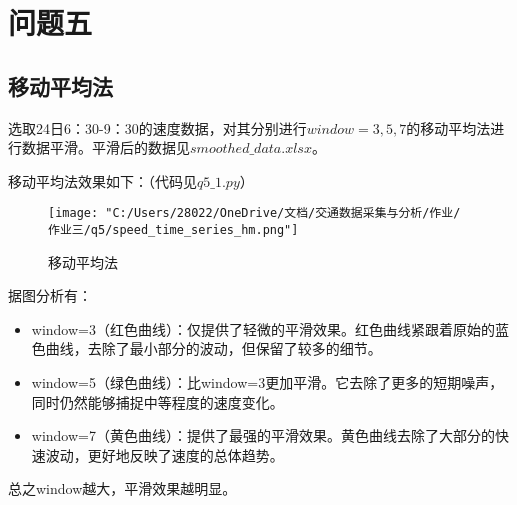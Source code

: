 \documentclass[withoutpreface,bwprint]{cumcmthesis} %
\begin{document}
\section{问题五}
    \subsection{移动平均法}
    选取24日6：30-9：30的速度数据，对其分别进行$window=3,5,7$的移动平均法进行数据平滑。平滑后的数据见$smoothed\_data.xlsx$。\par
    移动平均法效果如下：（代码见$q5\_1.py$）\par
    \begin{figure}[!htbp] 
        \centering
        \texttt{[image: "C:/Users/28022/OneDrive/文档/交通数据采集与分析/作业/作业三/q5/speed\_time\_series\_hm.png"]}
        \caption{移动平均法}
        \label{fig:your_label}
    \end{figure}\par
    据图分析有：\par
    \begin{itemize}
        \item window=3（红色曲线）：仅提供了轻微的平滑效果。红色曲线紧跟着原始的蓝色曲线，去除了最小部分的波动，但保留了较多的细节。
        \item window=5（绿色曲线）：比window=3更加平滑。它去除了更多的短期噪声，同时仍然能够捕捉中等程度的速度变化。
        \item window=7（黄色曲线）：提供了最强的平滑效果。黄色曲线去除了大部分的快速波动，更好地反映了速度的总体趋势。
    \end{itemize}
    总之window越大，平滑效果越明显。\par
\end{document}

